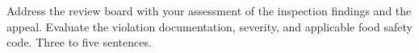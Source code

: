 Address the review board with your assessment of the inspection findings and the appeal. Evaluate the violation documentation, severity, and applicable food safety code. Three to five sentences.%
